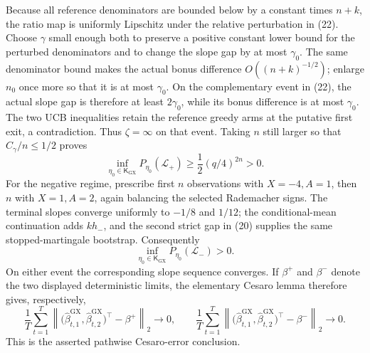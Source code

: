 Because all reference denominators are bounded below by a constant times \(n+k\), the ratio map is uniformly Lipschitz under the relative perturbation in (22).  Choose \(\gamma\) small enough both to preserve a positive constant lower bound for the perturbed denominators and to change the slope gap by at most \(\gamma_0\).  The same denominator bound makes the actual bonus difference \(O((n+k)^{-1/2})\); enlarge \(n_0\) once more so that it is at most \(\gamma_0\).  On the complementary event in (22), the actual slope gap is therefore at least \(2\gamma_0\), while its bonus difference is at most \(\gamma_0\).  The two UCB inequalities retain the reference greedy arms at the putative first exit, a contradiction.  Thus \(\zeta=\infty\) on that event.  Taking \(n\) still larger so that \(C_\gamma/n\leq1/2\) proves
\[
 \inf_{\eta_0\in\mathsf K_{\mathrm{GX}}}P_{\eta_0}(\mathcal L_+)
 \geq \frac12(q/4)^{2n}>0. \tag{23}
\]
For the negative regime, prescribe first \(n\) observations with \(X=-4,A=1\), then \(n\) with \(X=1,A=2\), again balancing the selected Rademacher signs.  The terminal slopes converge uniformly to \(-1/8\) and \(1/12\); the conditional-mean continuation adds \(kh_-\), and the second strict gap in (20) supplies the same stopped-martingale bootstrap.  Consequently
\[
 \inf_{\eta_0\in\mathsf K_{\mathrm{GX}}}P_{\eta_0}(\mathcal L_-)>0. \tag{24}
\]
On either event the corresponding slope sequence converges.  If \(\beta^+\) and \(\beta^-\) denote the two displayed deterministic limits, the elementary Cesaro lemma therefore gives, respectively,
\[
 \frac1T\sum_{t=1}^T\left\|\bigl(\widehat\beta^{\mathrm{GX}}_{t,1},\widehat\beta^{\mathrm{GX}}_{t,2}\bigr)^\top-\beta^+\right\|_2\longrightarrow0,
 \qquad
 \frac1T\sum_{t=1}^T\left\|\bigl(\widehat\beta^{\mathrm{GX}}_{t,1},\widehat\beta^{\mathrm{GX}}_{t,2}\bigr)^\top-\beta^-\right\|_2\longrightarrow0.
\]
This is the asserted pathwise Cesaro-error conclusion.

